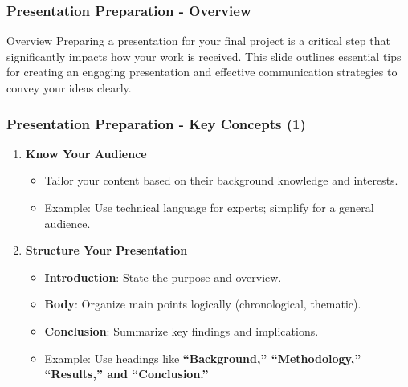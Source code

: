 \documentclass{beamer}
\begin{document}
\begin{frame}[fragile]
    \frametitle{Presentation Preparation - Overview}
    \begin{block}{Overview}
        Preparing a presentation for your final project is a critical step that significantly impacts how your work is received. 
        This slide outlines essential tips for creating an engaging presentation and effective communication strategies to convey your ideas clearly.
    \end{block}
\end{frame}

\begin{frame}[fragile]
    \frametitle{Presentation Preparation - Key Concepts (1)}
    \begin{enumerate}
        \item \textbf{Know Your Audience}
            \begin{itemize}
                \item Tailor your content based on their background knowledge and interests.
                \item Example: Use technical language for experts; simplify for a general audience.
            \end{itemize}
        
        \item \textbf{Structure Your Presentation}
            \begin{itemize}
                \item \textbf{Introduction}: State the purpose and overview.
                \item \textbf{Body}: Organize main points logically (chronological, thematic).
                \item \textbf{Conclusion}: Summarize key findings and implications.
                \item Example: Use headings like \textbf{“Background,” “Methodology,” “Results,” and “Conclusion.”} 
            \end{itemize}
    \end{enumerate}
\end{frame}
\end{document}
